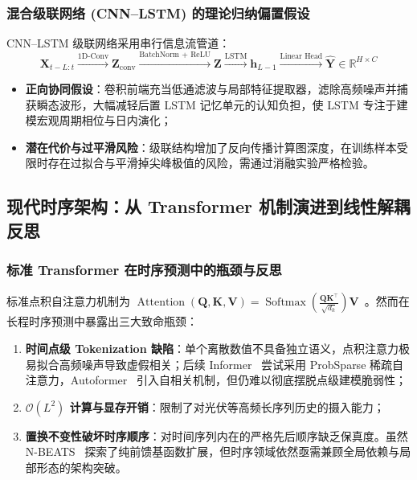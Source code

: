 \subsubsection{混合级联网络 (CNN--LSTM) 的理论归纳偏置假设}
CNN--LSTM 级联网络采用串行信息流管道：
\begin{equation}
    \mathbf{X}_{t-L:t} \xrightarrow{\text{1D-Conv}} \mathbf{Z}_{\text{conv}} \xrightarrow{\text{BatchNorm + ReLU}} \mathbf{Z} \xrightarrow{\text{LSTM}} \mathbf{h}_{L-1} \xrightarrow{\text{Linear Head}} \hat{\mathbf{Y}} \in \mathbb{R}^{H \times C}
\end{equation}
\begin{itemize}
    \item \textbf{正向协同假设}：卷积前端充当低通滤波与局部特征提取器，滤除高频噪声并捕获瞬态波形，大幅减轻后置 LSTM 记忆单元的认知负担，使 LSTM 专注于建模宏观周期相位与日内演化；
    \item \textbf{潜在代价与过平滑风险}：级联结构增加了反向传播计算图深度，在训练样本受限时存在过拟合与平滑掉尖峰极值的风险，需通过消融实验严格检验。
\end{itemize}

\subsection{现代时序架构：从 Transformer 机制演进到线性解耦反思}
\label{subsec:modern_zh}

\subsubsection{标准 Transformer 在时序预测中的瓶颈与反思}
标准点积自注意力机制为 $\operatorname{Attention}(\mathbf{Q}, \mathbf{K}, \mathbf{V}) = \operatorname{Softmax}\left(\frac{\mathbf{Q} \mathbf{K}^\top}{\sqrt{d_k}}\right) \mathbf{V}$~\cite{vaswani2017attention}。然而在长程时序预测中暴露出三大致命瓶颈：
\begin{enumerate}
    \item \textbf{时间点级 Tokenization 缺陷}：单个离散数值不具备独立语义，点积注意力极易拟合高频噪声导致虚假相关；后续 Informer~\cite{zhou2021informer} 尝试采用 ProbSparse 稀疏自注意力，Autoformer~\cite{wu2021autoformer} 引入自相关机制，但仍难以彻底摆脱点级建模脆弱性；
    \item \textbf{$\mathcal{O}(L^2)$ 计算与显存开销}：限制了对光伏等高频长序列历史的摄入能力；
    \item \textbf{置换不变性破坏时序顺序}：对时间序列内在的严格先后顺序缺乏保真度。虽然 N-BEATS~\cite{oreshkin2019nbeats} 探索了纯前馈基函数扩展，但时序领域依然亟需兼顾全局依赖与局部形态的架构突破。
\end{enumerate}

